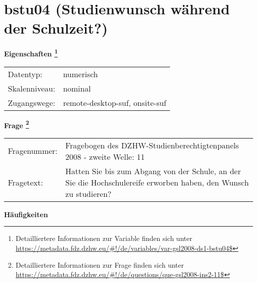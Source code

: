 
    \setcounter{footnote}{0}

    \vspace*{-1.8cm}
	\section{bstu04 (Studienwunsch während der Schulzeit?)}
	\label{section:bstu04}



    \vspace*{0.5cm}
    \noindent\textbf{Eigenschaften
	\footnote{Detailliertere Informationen zur Variable finden sich unter
		\url{https://metadata.fdz.dzhw.eu/\#!/de/variables/var-gsl2008-ds1-bstu04$}}}\\
	\begin{tabularx}{\hsize}{@{}lX}
	Datentyp: & numerisch \\
	Skalenniveau: & nominal \\
	Zugangswege: &
	  remote-desktop-suf, 
	  onsite-suf
 \\
    \end{tabularx}



				\vspace*{0.5cm}
                \noindent\textbf{Frage
	                \footnote{Detailliertere Informationen zur Frage finden sich unter
		              \url{https://metadata.fdz.dzhw.eu/\#!/de/questions/que-gsl2008-ins2-11$}}}\\
				\begin{tabularx}{\hsize}{@{}lX}
					Fragenummer: &
					  Fragebogen des DZHW-Studienberechtigtenpanels 2008 - zweite Welle:
					  11
 \\
					Fragetext: & Hatten Sie bis zum Abgang von der Schule, an der Sie die Hochschulereife erworben haben, den Wunsch zu studieren? \\
				\end{tabularx}





        		\vspace*{0.5cm}
                \noindent\textbf{Häufigkeiten}

